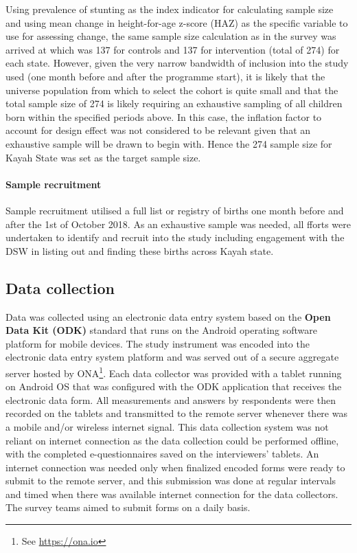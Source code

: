 \documentclass[12pt,a4paper]{article}
\let\oldparagraph\paragraph
\renewcommand{\paragraph}[1]{\oldparagraph{#1}\mbox{}}
\let\rmarkdownfootnote\footnote%
\def\footnote{\protect\rmarkdownfootnote}
\begin{document}
Using prevalence of stunting as the index indicator for calculating sample size and using mean change in height-for-age z-score (HAZ) as the specific variable to use for assessing change, the same sample size calculation as in the survey was arrived at which was 137 for controls and 137 for intervention (total of 274) for each state.
However, given the very narrow bandwidth of inclusion into the study used (one month before and after the programme start), it is likely that the universe population from which to select the cohort is quite small and that the total sample size of 274 is likely requiring an exhaustive sampling of all children born within the specified periods above. In this case, the inflation factor to account for design effect was not considered to be relevant given that an exhaustive sample will be drawn to begin with. Hence the 274 sample size for Kayah State was set as the target sample size.

\hypertarget{sample-recruitment}{%
\paragraph{Sample recruitment}\label{sample-recruitment}}

Sample recruitment utilised a full list or registry of births one month before and after the 1st of October 2018. As an exhaustive sample was needed, all fforts were undertaken to identify and recruit into the study including engagement with the DSW in listing out and finding these births across Kayah state.

\hypertarget{data-collection}{%
\subsection{Data collection}\label{data-collection}}

Data was collected using an electronic data entry system based on the \textbf{Open Data Kit (ODK)} standard that runs on the Android operating software platform for mobile devices. The study instrument was encoded into the electronic data entry system platform and was served out of a secure aggregate server hosted by ONA\footnote{See \url{https://ona.io}}. Each data collector was provided with a tablet running on Android OS that was configured with the ODK application that receives the electronic data form. All measurements and answers by respondents were then recorded on the tablets and transmitted to the remote server whenever there was a mobile and/or wireless internet signal. This data collection system was not reliant on internet connection as the data collection could be performed offline, with the completed e-questionnaires saved on the interviewers' tablets. An internet connection was needed only when finalized encoded forms were ready to submit to the remote server, and this submission was done at regular intervals and timed when there was available internet connection for the data collectors. The survey teams aimed to submit forms on a daily basis.
\end{document}
